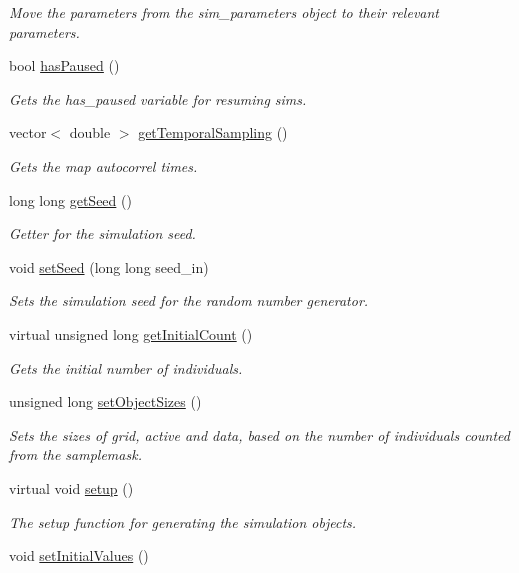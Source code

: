 \begin{DoxyCompactItemize}
\begin{DoxyCompactList}\small\item\em Move the parameters from the sim\+\_\+parameters object to their relevant parameters. \end{DoxyCompactList}\item 
bool \hyperlink{class_tree_ae07761c0a91a44ebe459904b1b8ffb43}{has\+Paused} ()
\begin{DoxyCompactList}\small\item\em Gets the has\+\_\+paused variable for resuming sims. \end{DoxyCompactList}\item 
vector$<$ double $>$ \hyperlink{class_tree_ac03c034a5730ee4f4d8727aace776412}{get\+Temporal\+Sampling} ()\hypertarget{class_tree_ac03c034a5730ee4f4d8727aace776412}{}\label{class_tree_ac03c034a5730ee4f4d8727aace776412}

\begin{DoxyCompactList}\small\item\em Gets the map autocorrel times. \end{DoxyCompactList}\item 
long long \hyperlink{class_tree_a857521315ca6bd9b3300d099488d74f1}{get\+Seed} ()
\begin{DoxyCompactList}\small\item\em Getter for the simulation seed. \end{DoxyCompactList}\item 
void \hyperlink{class_tree_ab240ab1988cbde281a6811b3fdc1dd5d}{set\+Seed} (long long seed\+\_\+in)
\begin{DoxyCompactList}\small\item\em Sets the simulation seed for the random number generator. \end{DoxyCompactList}\item 
virtual unsigned long \hyperlink{class_tree_a1e0685310a5a9bca4d6069e8d4ce1f1b}{get\+Initial\+Count} ()
\begin{DoxyCompactList}\small\item\em Gets the initial number of individuals. \end{DoxyCompactList}\item 
unsigned long \hyperlink{class_tree_a869ab0aba75336f737cbb137c74b8abc}{set\+Object\+Sizes} ()
\begin{DoxyCompactList}\small\item\em Sets the sizes of grid, active and data, based on the number of individuals counted from the samplemask. \end{DoxyCompactList}\item 
virtual void \hyperlink{class_tree_aec10ea2b720edc13a38310afdfe2b6e4}{setup} ()
\begin{DoxyCompactList}\small\item\em The setup function for generating the simulation objects. \end{DoxyCompactList}\item 
void \hyperlink{class_tree_aec2640897132a1b667e852bbafc14c78}{set\+Initial\+Values} ()\hypertarget{class_tree_aec2640897132a1b667e852bbafc14c78}{}\label{class_tree_aec2640897132a1b667e852bbafc14c78}


\end{DoxyCompactItemize}
